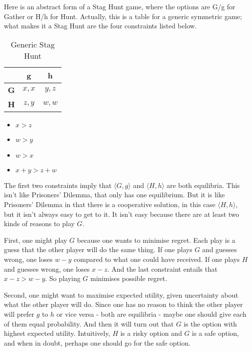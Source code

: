 \documentclass[
  12pt,
]{article}
\providecommand{\tightlist}{%
  \setlength{\itemsep}{0pt}\setlength{\parskip}{0pt}}
\begin{document}
Here is an abstract form of a Stag Hunt game, where the options are G/g
for Gather or H/h for Hunt. Actually, this is a table for a generic
symmetric game; what makes it a Stag Hunt are the four constraints
listed below.

\begin{table}[H]

\caption{\label{tab:unnamed-chunk-7}Generic Stag Hunt}
\centering
\begin{tabular}[t]{>{}r|cc}

\textbf{} & \textbf{g} & \textbf{h}\\
\midrule
\textbf{G} & $x, x$ & $y, z$\\
\textbf{H} & $z, y$ & $w, w$\\

\end{tabular}
\end{table}

\begin{itemize}
\tightlist
\item
  \(x > z\)
\item
  \(w > y\)
\item
  \(w > x\)
\item
  \(x + y > z + w\)
\end{itemize}

The first two constraints imply that \(\langle G, g \rangle\) and
\(\langle H, h \rangle\) are both equilibria. This isn't like Prisoners'
Dilemma, that only has one equilibrium. But it is like Prisoners'
Dilemma in that there is a cooperative solution, in this case
\(\langle H, h \rangle\), but it isn't always easy to get to it. It
isn't easy because there are at least two kinds of reasons to play
\(G\).

First, one might play \(G\) because one wants to minimise regret. Each
play is a guess that the other player will do the same thing. If one
plays \(G\) and guesses wrong, one loses \(w - y\) compared to what one
could have received. If one plays \(H\) and guesses wrong, one loses
\(x - z\). And the last constraint entails that \(x - z > w - y\). So
playing \(G\) minimises possible regret.

Second, one might want to maximise expected utility, given uncertainty
about what the other player will do. Since one has no reason to think
the other player will prefer \(g\) to \(h\) or vice versa - both are
equilibria - maybe one should give each of them equal probability. And
then it will turn out that \(G\) is the option with highest expected
utility. Intuitively, \(H\) is a risky option and \(G\) is a safe
option, and when in doubt, perhaps one should go for the safe option.
\end{document}
